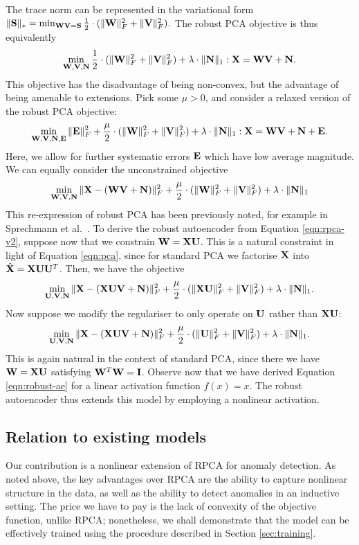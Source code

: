 The trace norm can be represented in the variational form~\cite{recht2010guaranteed}
$ \| \mathbf{S} \|_* = \min_{\mathbf{W} \mathbf{V} = \mathbf{S}} \frac{1}{2} \cdot (\| \mathbf{W} \|_F^2 + \| \mathbf{V} \|_F^2). $
The robust PCA objective is thus equivalently
$$ \min_{\mathbf{W}, \mathbf{V}, \mathbf{N}} \frac{1}{2} \cdot (\| \mathbf{W} \|_F^2 + \| \mathbf{V} \|_F^2) + \lambda \cdot \| \mathbf{N} \|_1 : \mathbf{X} = \mathbf{W} \mathbf{V} + \mathbf{N}. $$
This objective has the disadvantage of being non-convex,
but the advantage of being amenable to extensions.
Pick some $\mu > 0$, and consider a relaxed version of the robust PCA objective:
$$ \min_{\mathbf{W}, \mathbf{V}, \mathbf{N}, \mathbf{E}} \| \mathbf{E} \|_F^2 + \frac{\mu}{2} \cdot (\| \mathbf{W} \|_F^2 + \| \mathbf{V} \|_F^2) + \lambda \cdot \| \mathbf{N} \|_1 : \mathbf{X} = \mathbf{W} \mathbf{V} + \mathbf{N} + \mathbf{E}. $$
Here, we allow for further systematic errors $\mathbf{E}$
which have low average magnitude.
We can equally consider the unconstrained objective
\begin{equation}
	\label{eqn:rpca-v2}
	\min_{\mathbf{W}, \mathbf{V}, \mathbf{N}} \| \mathbf{X} - (\mathbf{W} \mathbf{V} + \mathbf{N}) \|_F^2 + \frac{\mu}{2} \cdot (\| \mathbf{W} \|_F^2 + \| \mathbf{V} \|_F^2) + \lambda \cdot \| \mathbf{N} \|_1
\end{equation}
This re-expression of robust PCA has been previously noted, for example in Sprechmann et al.~\cite{Sprechmann:2015}.
To derive the robust autoencoder from Equation \ref{eqn:rpca-v2}, suppose now that we constrain $\mathbf{W} = \mathbf{X} \mathbf{U}$.
This is a natural constraint in light of Equation \ref{eqn:pca}, since for standard PCA we factorise $\mathbf{X}$ into $\hat{\mathbf{X}} = \mathbf{X} \mathbf{U} \mathbf{U}^T$.
Then, we have the objective
$$ \min_{\mathbf{U}, \mathbf{V}, \mathbf{N}} \| \mathbf{X} - (\mathbf{X} \mathbf{U} \mathbf{V} + \mathbf{N}) \|_F^2 + \frac{\mu}{2} \cdot (\| \mathbf{X} \mathbf{U} \|_F^2 + \| \mathbf{V} \|_F^2) + \lambda \cdot \| \mathbf{N} \|_1. $$
Now suppose we modify the regulariser to only operate on $\mathbf{U}$ rather than $\mathbf{X} \mathbf{U}$:
$$ \min_{\mathbf{U}, \mathbf{V}, \mathbf{N}} \| \mathbf{X} - (\mathbf{X} \mathbf{U} \mathbf{V} + \mathbf{N}) \|_F^2 + \frac{\mu}{2} \cdot (\| \mathbf{U} \|_F^2 + \| \mathbf{V} \|_F^2) + \lambda \cdot \| \mathbf{N} \|_1. $$
This is again natural in the context of standard PCA, since there we have $\mathbf{W} = \mathbf{X} \mathbf{U}$ satisfying $\mathbf{W}^T \mathbf{W} = \mathbf{I}$.
Observe now that we have derived Equation \ref{eqn:robust-ae} for a linear activation function $f( x ) = x$.
The robust autoencoder thus extends this model by employing a nonlinear activation.


%
\subsection{Relation to existing models}

Our contribution is a nonlinear extension of RPCA for anomaly detection.
As noted above, the key advantages over RPCA are the ability to capture nonlinear structure in the data, as well as the ability to detect anomalies in an inductive setting.
The price we have to pay is the lack of convexity of the objective function, unlike RPCA;
nonetheless, we shall demonstrate that the model can be effectively trained using the procedure described in Section \ref{sec:training}.

